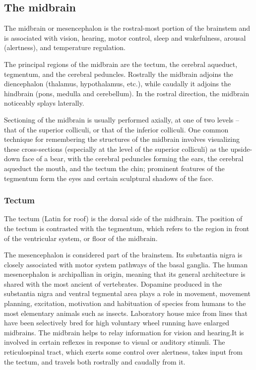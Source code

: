 \documentclass[]{book}
\begin{document}
\hypertarget{the-midbrain}{%
\subsection{The midbrain}\label{the-midbrain}}

The midbrain or mesencephalon is the rostral-most portion of the brainstem and is associated with vision, hearing, motor control, sleep and wakefulness, arousal (alertness), and temperature regulation.

The principal regions of the midbrain are the tectum, the cerebral aqueduct, tegmentum, and the cerebral peduncles. Rostrally the midbrain adjoins the diencephalon (thalamus, hypothalamus, etc.), while caudally it adjoins the hindbrain (pons, medulla and cerebellum). In the rostral direction, the midbrain noticeably splays laterally.

Sectioning of the midbrain is usually performed axially, at one of two levels -- that of the superior colliculi, or that of the inferior colliculi. One common technique for remembering the structures of the midbrain involves visualizing these cross-sections (especially at the level of the superior colliculi) as the upside-down face of a bear, with the cerebral peduncles forming the ears, the cerebral aqueduct the mouth, and the tectum the chin; prominent features of the tegmentum form the eyes and certain sculptural shadows of the face.

\hypertarget{tectum}{%
\subsubsection{Tectum}\label{tectum}}

The tectum (Latin for roof) is the dorsal side of the midbrain. The position of the tectum is contrasted with the tegmentum, which refers to the region in front of the ventricular system, or floor of the midbrain.

The mesencephalon is considered part of the brainstem. Its substantia nigra is closely associated with motor system pathways of the basal ganglia. The human mesencephalon is archipallian in origin, meaning that its general architecture is shared with the most ancient of vertebrates. Dopamine produced in the substantia nigra and ventral tegmental area plays a role in movement, movement planning, excitation, motivation and habituation of species from humans to the most elementary animals such as insects. Laboratory house mice from lines that have been selectively bred for high voluntary wheel running have enlarged midbrains. The midbrain helps to relay information for vision and hearing.It is involved in certain reflexes in response to visual or auditory stimuli. The reticulospinal tract, which exerts some control over alertness, takes input from the tectum, and travels both rostrally and caudally from it.
\end{document}
